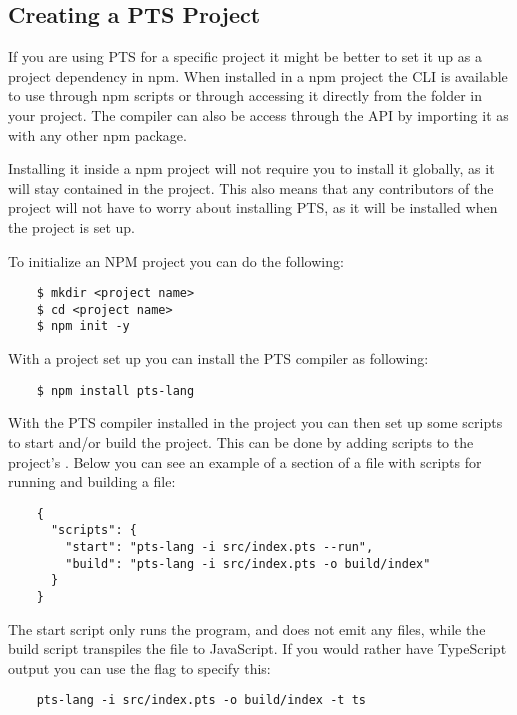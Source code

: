 \subsection{Creating a PTS Project}\label{subsec:creating-a-pts-project}

If you are using PTS for a specific project it might be better to set it up as a project dependency in npm.
When installed in a npm project the CLI is available to use through npm scripts or through accessing it directly from the  folder in your project.
The compiler can also be access through the API by importing it as with any other npm package.

Installing it inside a npm project will not require you to install it globally, as it will stay contained in the project.
This also means that any contributors of the project will not have to worry about installing PTS, as it will be installed when the project is set up.

To initialize an NPM project you can do the following:

\begin{verbatim}
    $ mkdir <project name>
    $ cd <project name>
    $ npm init -y
\end{verbatim}

With a project set up you can install the PTS compiler as following:

\begin{verbatim}
    $ npm install pts-lang
\end{verbatim}

With the PTS compiler installed in the project you can then set up some scripts to start and/or build the project.
This can be done by adding scripts to the project's .
Below you can see an example of a section of a  file with scripts for running and building a file:

\begin{verbatim}
    {
      "scripts": {
        "start": "pts-lang -i src/index.pts --run",
        "build": "pts-lang -i src/index.pts -o build/index"
      }
    }
\end{verbatim}

The start script only runs the program, and does not emit any files, while the build script transpiles the  file to JavaScript.
If you would rather have TypeScript output you can use the  flag to specify this:

\begin{verbatim}
    pts-lang -i src/index.pts -o build/index -t ts
\end{verbatim}

